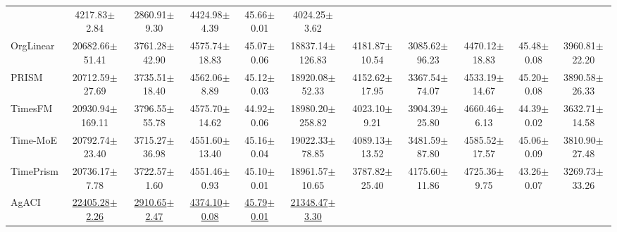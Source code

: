 \documentclass[sigplan,10pt, anonymous]{acmart}
\begin{document}
\begin{table}[t]
{\begin{tabular}{lcccccccccc}
                          & 4217.83{\scriptsize$\pm$2.84}   & 2860.91{\scriptsize$\pm$9.30}  & 4424.98{\scriptsize$\pm$4.39}  & 45.66{\scriptsize$\pm$0.01} & 4024.25{\scriptsize$\pm$3.62} \\
            OrgLinear     & 20682.66{\scriptsize$\pm$51.41} & 3761.28{\scriptsize$\pm$42.90} & 4575.74{\scriptsize$\pm$18.83} & 45.07{\scriptsize$\pm$0.06} & 18837.14{\scriptsize$\pm$126.83} 
                          & 4181.87{\scriptsize$\pm$10.54}  & 3085.62{\scriptsize$\pm$96.23} & 4470.12{\scriptsize$\pm$18.83} & 45.48{\scriptsize$\pm$0.08} & 3960.81{\scriptsize$\pm$22.20} \\
            PRISM         & 20712.59{\scriptsize$\pm$27.69} & 3735.51{\scriptsize$\pm$18.40} & 4562.06{\scriptsize$\pm$8.89}  & 45.12{\scriptsize$\pm$0.03} & 18920.08{\scriptsize$\pm$52.33} 
                          & 4152.62{\scriptsize$\pm$17.95}  & 3367.54{\scriptsize$\pm$74.07} & 4533.19{\scriptsize$\pm$14.67} & 45.20{\scriptsize$\pm$0.08} & 3890.58{\scriptsize$\pm$26.33} \\
            \cmidrule(l){1-11}
            TimesFM       & 20930.94{\scriptsize$\pm$169.11}& 3796.55{\scriptsize$\pm$55.78} & 4575.70{\scriptsize$\pm$14.62} & 44.92{\scriptsize$\pm$0.06} & 18980.20{\scriptsize$\pm$258.82} 
                          & 4023.10{\scriptsize$\pm$9.21}   & 3904.39{\scriptsize$\pm$25.80} & 4660.46{\scriptsize$\pm$6.13}  & 44.39{\scriptsize$\pm$0.02} & 3632.71{\scriptsize$\pm$14.58} \\
            Time-MoE      & 20792.74{\scriptsize$\pm$23.40} & 3715.27{\scriptsize$\pm$36.98} & 4551.60{\scriptsize$\pm$13.40} & 45.16{\scriptsize$\pm$0.04} & 19022.33{\scriptsize$\pm$78.85} 
                          & 4089.13{\scriptsize$\pm$13.52}  & 3481.59{\scriptsize$\pm$87.80} & 4585.52{\scriptsize$\pm$17.57} & 45.06{\scriptsize$\pm$0.09} & 3810.90{\scriptsize$\pm$27.48} \\
            TimePrism     & 20736.17{\scriptsize$\pm$7.78}  & 3722.57{\scriptsize$\pm$1.60}  & 4551.46{\scriptsize$\pm$0.93}  & 45.10{\scriptsize$\pm$0.01} & 18961.57{\scriptsize$\pm$10.65} 
                          & 3787.82{\scriptsize$\pm$25.40}  & 4175.60{\scriptsize$\pm$11.86} & 4725.36{\scriptsize$\pm$9.75}  & 43.26{\scriptsize$\pm$0.07} & 3269.73{\scriptsize$\pm$33.26} \\
            \cmidrule(l){1-11}
            AgACI         & \underline{22405.28{\scriptsize$\pm$2.26}} & \underline{2910.65{\scriptsize$\pm$2.47}} & \underline{4374.10{\scriptsize$\pm$0.08}} & \underline{45.79{\scriptsize$\pm$0.01}} & \underline{21348.47{\scriptsize$\pm$3.30}} 

\end{tabular}}
\end{table}
\end{document}
